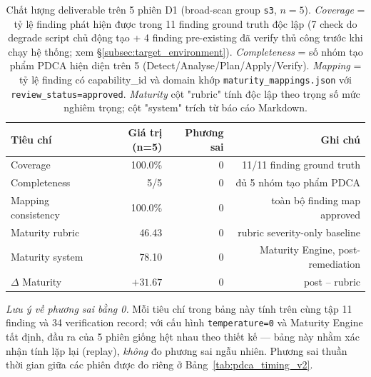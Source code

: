 \begin{table}[H]
  \centering
  \caption{Chất lượng deliverable trên 5 phiên D1 (broad-scan group \texttt{s3}, $n=5$). \textit{Coverage} = tỷ lệ finding phát hiện được trong 11 finding ground truth độc lập (7 check do degrade script chủ động tạo + 4 finding pre-existing đã verify thủ công trước khi chạy hệ thống; xem \S\ref{subsec:target_environment}). \textit{Completeness} = số nhóm tạo phẩm PDCA hiện diện trên 5 (Detect/Analyse/Plan/Apply/Verify). \textit{Mapping} = tỷ lệ finding có capability\_id và domain khớp \texttt{maturity\_mappings.json} với \texttt{review\_status=approved}. \textit{Maturity} cột "rubric" tính độc lập theo trọng số mức nghiêm trọng; cột "system" trích từ báo cáo Markdown.}
  \label{tab:d2_deliverable_quality}
  \small
  \begin{tabular}{lrrr}
    \toprule
    \textbf{Tiêu chí} & \textbf{Giá trị (n=5)} & \textbf{Phương sai} & \textbf{Ghi chú} \\
    \midrule
    Coverage             & 100.0\%  & 0     & 11/11 finding ground truth \\
    Completeness         & 5/5      & 0     & đủ 5 nhóm tạo phẩm PDCA \\
    Mapping consistency  & 100.0\%  & 0     & toàn bộ finding map approved \\
    Maturity rubric      & 46.43    & 0     & rubric severity-only baseline \\
    Maturity system      & 78.10    & 0     & Maturity Engine, post-remediation \\
    $\Delta$ Maturity    & $+31.67$ & 0     & post -- rubric \\
    \bottomrule
  \end{tabular}

  \vspace{1mm}
  \footnotesize
  \textit{Lưu ý về phương sai bằng 0.} Mỗi tiêu chí trong bảng này tính trên cùng tập 11 finding và 34 verification record; với cấu hình \texttt{temperature=0} và Maturity Engine tất định, đầu ra của 5 phiên giống hệt nhau theo thiết kế --- bảng này nhằm xác nhận tính lặp lại (replay), \emph{không} đo phương sai ngẫu nhiên. Phương sai thuần thời gian giữa các phiên được đo riêng ở Bảng~\ref{tab:pdca_timing_v2}.
\end{table}
